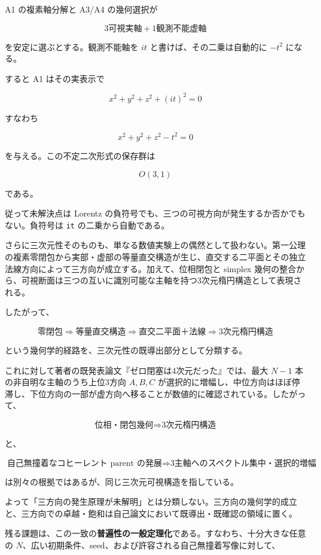 \documentclass[
  a4paper,
]{ltjsarticle}
\begin{document}
A1 の複素軸分解と A3/A4 の幾何選択が

\[
\boxed{
3\text{可視実軸}
+
1\text{観測不能虚軸}
}
\]

を安定に選ぶとする。観測不能軸を \(it\) と書けば、その二乗は自動的に
\(-t^2\) になる。

すると A1 はその実表示で

\[
x^2+y^2+z^2+(it)^2=0
\]

すなわち

\[
\boxed{x^2+y^2+z^2-t^2=0}
\]

を与える。この不定二次形式の保存群は

\[
O(3,1)
\]

である。

従って未解決点は Lorentz
の負符号でも、三つの可視方向が発生するか否かでもない。負符号は
\texttt{it} の二乗から自動である。

さらに三次元性そのものも、単なる数値実験上の偶然として扱わない。第一公理の複素零閉包から実部・虚部の等量直交構造が生じ、直交する二平面とその独立法線方向によって三方向が成立する。加えて、位相閉包と
simplex
幾何の整合から、可視断面は三つの互いに識別可能な主軸を持つ3次元楕円構造として表現される。

したがって、

\[
\boxed{
\text{零閉包}
\Longrightarrow
\text{等量直交構造}
\Longrightarrow
\text{直交二平面＋法線}
\Longrightarrow
\text{3次元楕円構造}
}
\]

という幾何学的経路を、三次元性の既導出部分として分類する。

これに対して著者の既発表論文『ゼロ閉塞は4次元だった』では、最大 \(N-1\)
本の非自明な主軸のうち上位3方向 \(A,B,C\)
が選択的に増幅し、中位方向はほぼ停滞し、下位方向の一部が虚方向へ移ることが数値的に確認されている。したがって、

\[
\boxed{
\text{位相・閉包幾何}
\Longrightarrow
\text{3次元楕円構造}
}
\]

と、

\[
\boxed{
\text{自己無撞着なコヒーレント parent の発展}
\Longrightarrow
\text{3主軸へのスペクトル集中・選択的増幅}
}
\]

は別々の根拠ではあるが、同じ三次元可視構造を指している。

よって「三方向の発生原理が未解明」とは分類しない。三方向の幾何学的成立と、三方向での卓越・飽和は自己論文において既導出・既確認の領域に置く。

残る課題は、この一致の\textbf{普遍性の一般定理化}である。すなわち、十分大きな任意の
\(N\)、広い初期条件、seed、および許容される自己無撞着写像に対して、
\end{document}
